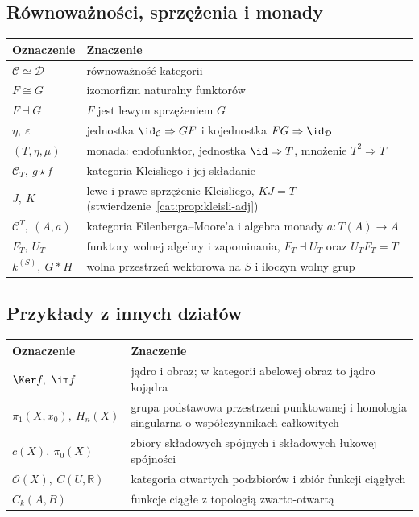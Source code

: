 \subsection{Równoważności, sprzężenia i monady}
\begin{center}
\renewcommand{\arraystretch}{1.15}
\begin{tabular}{@{}p{.34\linewidth}p{.60\linewidth}@{}}
\textbf{Oznaczenie} & \textbf{Znaczenie} \\
\hline
$\mathcal C\simeq\mathcal D$ & równoważność kategorii \\
$F\cong G$ & izomorfizm naturalny funktorów \\
$F\dashv G$ & $F$ jest lewym sprzężeniem $G$ \\
$\eta,\ \varepsilon$ & jednostka $\id_{\mathcal C}\Rightarrow GF$ i kojednostka $FG\Rightarrow\id_{\mathcal D}$ \\
$(T,\eta,\mu)$ & monada: endofunktor, jednostka $\id\Rightarrow T$, mnożenie $T^2\Rightarrow T$ \\
$\mathcal C_T,\ g\star f$ & kategoria Kleisliego i jej składanie \\
$J,\ K$ & lewe i prawe sprzężenie Kleisliego, $KJ=T$ (stwierdzenie~\ref{cat:prop:kleisli-adj}) \\
$\mathcal C^T,\ (A,a)$ & kategoria Eilenberga--Moore'a i algebra monady $a:T(A)\to A$ \\
$F_T,\ U_T$ & funktory wolnej algebry i zapominania, $F_T\dashv U_T$ oraz $U_TF_T=T$ \\
$k^{(S)},\ G*H$ & wolna przestrzeń wektorowa na $S$ i iloczyn wolny grup \\
\end{tabular}
\end{center}

\subsection{Przykłady z innych działów}
\begin{center}
\renewcommand{\arraystretch}{1.15}
\begin{tabular}{@{}p{.34\linewidth}p{.60\linewidth}@{}}
\textbf{Oznaczenie} & \textbf{Znaczenie} \\
\hline
$\Ker f,\ \im f$ & jądro i obraz; w kategorii abelowej obraz to jądro kojądra \\
$\pi_1(X,x_0),\ H_n(X)$ & grupa podstawowa przestrzeni punktowanej i homologia singularna o współczynnikach całkowitych \\
$c(X),\ \pi_0(X)$ & zbiory składowych spójnych i składowych łukowej spójności \\
$\mathcal O(X),\ C(U,\mathbb R)$ & kategoria otwartych podzbiorów i zbiór funkcji ciągłych \\
$C_k(A,B)$ & funkcje ciągłe z topologią zwarto-otwartą \\
\end{tabular}
\end{center}

